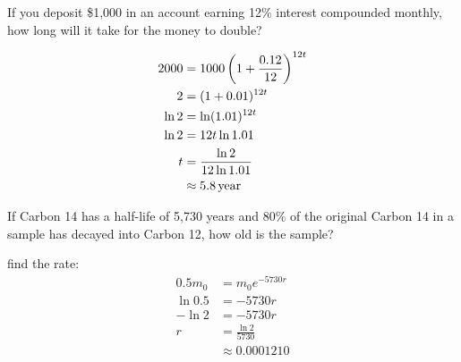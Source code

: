 \documentclass[fleqn,addpoints]{exam}
\begin{document}
\begin{questions}

    \question[7]
      If you deposit \$1,000 in an account earning 12\% interest compounded monthly, how long will it take for the money
      to double?

      \begin{solution}
        \begin{align*}
          2000  & = 1000 \left( 1 + \frac{0.12}{12} \right)^{12t} \\
          2     & = ( 1 + 0.01 )^{12t} \\
          \ln 2 & = \ln (1.01)^{12t} \\
          \ln 2 & = 12 t \ln 1.01 \\
          t     & = \frac{\ln 2}{12 \ln 1.01 } \\
                & \approx \unit[5.8]{year} \\
        \end{align*}
      \end{solution}

    \question[10]
      If Carbon 14 has a half-life of 5,730 years and 80\% of the original Carbon 14 in a sample has decayed into Carbon
      12, how old is the sample?

      \begin{solution}
        find the rate:
        \begin{align*}
          0.5 m_0 & = m_0 e^{-5730r} \\
          \ln 0.5 & = -5730r \\
          - \ln 2 & = -5730r \\
          r       & = \frac{\ln 2}{5730} \\
                  & \approx 0.0001210 \\
        \end{align*}


\end{solution}
\end{questions}
\end{document}
